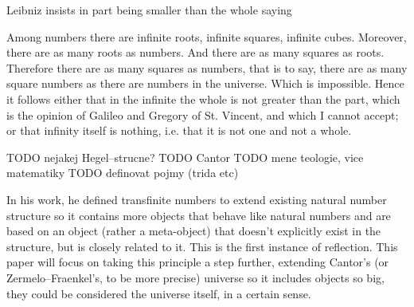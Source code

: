 \documentclass[12pt,a4paper]{article}
\begin{document}
Leibniz insists in part being smaller than the whole saying
\begin{displayquote}
Among numbers there are infinite roots, infinite squares, infinite cubes. Moreover, there are
as many roots as numbers. And there are as many squares as roots. Therefore there are as
many squares as numbers, that is to say, there are as many square numbers as there are
numbers in the universe. Which is impossible. Hence it follows either that in the infinite the
whole is not greater than the part, which is the opinion of Galileo and Gregory of St.
Vincent, and which I cannot accept; or that infinity itself is nothing, i.e. that it is not one and
not a whole. %
\end{displayquote}
TODO  nejakej Hegel--strucne?
TODO Cantor
TODO mene teologie, vice matematiky
TODO definovat pojmy (trida etc)

In his work, he defined transfinite numbers to extend existing natural number %
structure so it contains more objects that behave like natural numbers and are based on an object (rather a meta-object) that doesn't explicitly exist in the structure, but is closely related to it. This is the first instance of reflection. 
This paper will focus on taking this principle a step further, extending Cantor's (or Zermelo–Fraenkel's, to be more precise) universe so it includes objects so big, they could be considered the universe itself, in a certain sense. %
\end{document}
